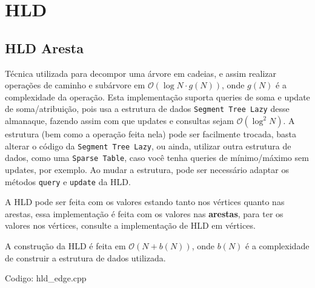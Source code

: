\documentclass[10pt, a4paper, oneside]{book}
\begin{document}
\section{HLD}
\subsection{HLD Aresta}


Técnica utilizada para decompor uma árvore em cadeias, e assim realizar operações de caminho e subárvore em $\mathcal{O}(\log N \cdot g(N))$, onde $g(N)$ é a complexidade da operação. Esta implementação suporta queries de soma e update de soma/atribuição, pois usa a estrutura de dados \texttt{Segment Tree Lazy} desse almanaque, fazendo assim com que updates e consultas sejam  $\mathcal{O}(\log^2 N)$. A estrutura (bem como a operação feita nela) pode ser facilmente trocada, basta alterar o código da \texttt{Segment Tree Lazy}, ou ainda, utilizar outra estrutura de dados, como uma \texttt{Sparse Table}, caso você tenha queries de mínimo/máximo sem updates, por exemplo. Ao mudar a estrutura, pode ser necessário adaptar os métodos \texttt{query} e \texttt{update} da HLD.



A HLD pode ser feita com os valores estando tanto nos vértices quanto nas arestas, essa implementação é feita com os valores nas \textbf{arestas}, para ter os valores nos vértices, consulte a implementação de HLD em vértices.



A construção da HLD é feita em $\mathcal{O}(N + b(N))$, onde $b(N)$ é a complexidade de construir a estrutura de dados utilizada.
\hfill

Codigo: hld\_edge.cpp
\end{document}
